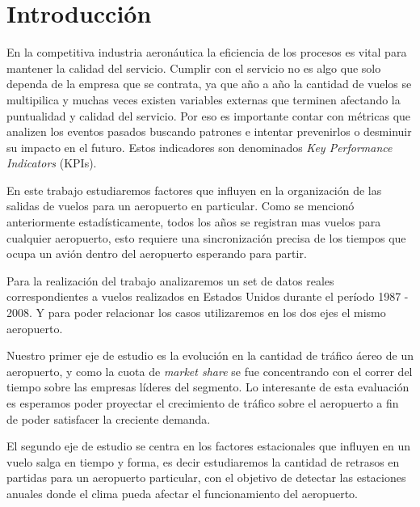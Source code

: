 \documentclass{endm}
\begin{document}
\section{Introducci\'on}\label{intro}


En la competitiva industria aeron\'autica la eficiencia de los procesos es vital para mantener la calidad del servicio. Cumplir con el servicio no es algo que solo dependa de la empresa que se contrata, ya que año a año la cantidad de vuelos se multipilica y muchas veces existen variables externas que terminen afectando la puntualidad y calidad del servicio. Por eso es importante contar con m\'etricas que analizen los eventos pasados buscando patrones e intentar prevenirlos o desminuir su impacto en el futuro. Estos indicadores son denominados \textit{Key Performance Indicators} (KPIs).

En este trabajo estudiaremos factores que influyen en la organización de las salidas de vuelos para un aeropuerto en particular. Como se mencion\'o anteriormente estad\'isticamente, todos los años se registran mas vuelos para cualquier aeropuerto, esto requiere una sincronizaci\'on precisa de los tiempos que ocupa un avi\'on dentro del aeropuerto esperando para partir.

Para la realización del trabajo analizaremos un set de datos reales correspondientes a vuelos realizados en Estados Unidos durante el per\'iodo 1987 - 2008. Y para poder relacionar los casos utilizaremos en los dos ejes el mismo aeropuerto.

Nuestro primer eje de estudio es la evoluci\'on en la cantidad de tr\'afico \'aereo de un aeropuerto, y como la cuota de \textit{market share} se fue concentrando con el correr del tiempo sobre las empresas l\'ideres del segmento. Lo interesante de esta evaluaci\'on es esperamos poder proyectar el crecimiento de tr\'afico sobre el aeropuerto a fin de poder satisfacer la creciente demanda.

El segundo eje de estudio se centra en los factores estacionales que influyen en un vuelo salga en tiempo y forma, es decir estudiaremos la cantidad de retrasos en partidas para un aeropuerto particular, con el objetivo de detectar las estaciones anuales donde el clima pueda afectar el funcionamiento del aeropuerto.
\end{document}
